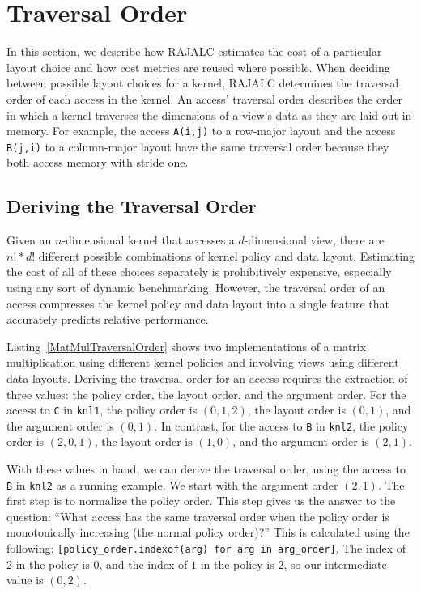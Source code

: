 \documentclass{article}
\begin{document}
\section{Traversal Order}

In this section, we describe how RAJALC estimates the cost of a particular layout choice and how cost metrics are reused where possible.
When deciding between possible layout choices for a kernel, RAJALC determines the traversal order of each access in the kernel.
An access' traversal order describes the order in which a kernel traverses the dimensions of a view's data as they are laid out in memory. 
For example, the access \verb.A(i,j). to a row-major layout and the access \verb.B(j,i). to a column-major layout have the same traversal order because they both access memory with stride one.

\subsection{Deriving the Traversal Order}

Given an $n$-dimensional kernel that accesses a $d$-dimensional view, there are $n! * d!$ different possible combinations of kernel policy and data layout. 
Estimating the cost of all of these choices separately is prohibitively expensive, especially using any sort of dynamic benchmarking. 
However, the traversal order of an access compresses the kernel policy and data layout into a single feature that accurately predicts relative performance.

Listing~\ref{MatMulTraversalOrder} shows two implementations of a matrix multiplication using different kernel policies and involving views using different data layouts.
Deriving the traversal order for an access requires the extraction of three values: the policy order, the layout order, and the argument order. 
For the access to \verb.C. in \verb.knl1., the policy order is $(0,1,2)$, the layout order is $(0,1)$, and the argument order is $(0,1)$. 
In contrast, for the access to \verb.B. in \verb.knl2., the policy order is $(2,0,1)$, the layout order is $(1,0)$, and the argument order is $(2,1)$. 

With these values in hand, we can derive the traversal order, using the access to \verb.B. in \verb.knl2. as a running example. 
We start with the argument order $(2,1)$.
The first step is to normalize the policy order.
This step gives us the answer to the question: \enquote{What access has the same traversal order when the policy order is monotonically increasing (the normal policy order)?}
This is calculated using the following: \verb,[policy_order.indexof(arg) for arg in arg_order],. 
The index of $2$ in the policy is $0$, and the index of $1$ in the policy is $2$, so our intermediate value is $(0,2)$. 
\end{document}
